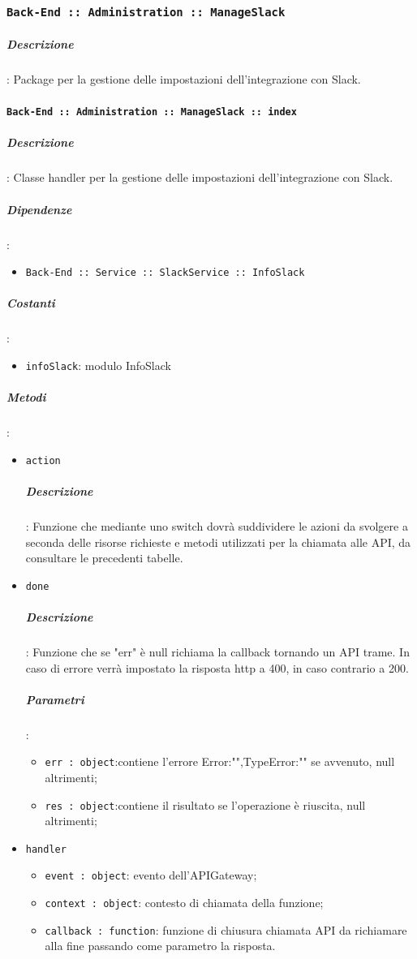 \documentclass[../DefinizioneDiProdotto_v3.0.0.tex]{subfiles}
\begin{document}
\subsubsection{\texttt{Back-End :: Administration :: ManageSlack}}
\subparagraph{Descrizione}: Package per la gestione delle impostazioni dell'integrazione con Slack.

\paragraph{\texttt{Back-End :: Administration :: ManageSlack :: index}}
\subparagraph{Descrizione}: Classe handler per la gestione delle impostazioni dell'integrazione con Slack.
\subparagraph{Dipendenze}:
\begin{itemize}
	\item \texttt{Back-End :: Service :: SlackService :: InfoSlack}
\end{itemize}
\subparagraph{Costanti}:
\begin{itemize}
	\item \texttt{infoSlack}: modulo InfoSlack
\end{itemize}
\subparagraph{Metodi}:
\begin{itemize}
	\item \texttt{action}
	      \subparagraph{Descrizione}: Funzione che mediante uno switch dovrà suddividere le azioni da svolgere a seconda delle risorse richieste e metodi utilizzati per la chiamata alle API, da consultare le precedenti tabelle.
	\item \texttt{done}
	      \subparagraph{Descrizione}: Funzione che se "err" è null richiama la callback tornando un API trame. In caso di errore verrà impostato la risposta http a 400, in caso contrario a 200.
	      \subparagraph{Parametri}:
	      \begin{itemize}
	      	\item \texttt{err : object}:contiene l'errore {Error:"",TypeError:""} se avvenuto, null altrimenti;
	      	\item \texttt{res : object}:contiene il risultato se l'operazione è riuscita, null altrimenti;
	      \end{itemize}
	\item \texttt{handler}
	      \begin{itemize}
	      	\item \texttt{event : object}: evento dell'APIGateway;
	      	\item \texttt{context : object}: contesto di chiamata della funzione;
	      	\item \texttt{callback : function}: funzione di chiusura chiamata API da richiamare alla fine passando come parametro la risposta.
	      \end{itemize}
\end{itemize}
\end{document}
